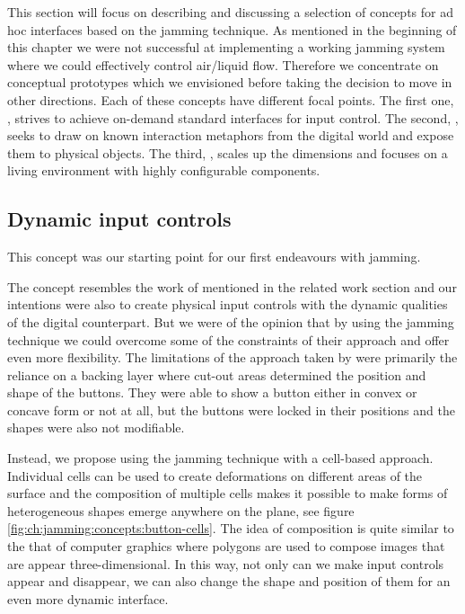 This section will focus on describing and discussing a selection of concepts for ad hoc interfaces based on the jamming technique.
As mentioned in the beginning of this chapter we were not successful at implementing a working jamming system where we could effectively control air/liquid flow.
Therefore we concentrate on conceptual prototypes which we envisioned before taking the decision to move in other directions.
Each of these concepts have different focal points.
The first one, \emph{}, strives to achieve on-demand standard interfaces for input control.
The second, \emph{}, seeks to draw on known interaction metaphors from the digital world and expose them to physical objects.
The third, \emph{}, scales up the dimensions and focuses on a living environment with highly configurable components.

\subsection{Dynamic input controls} 
\label{ch:jamming:concepts:dynamic_input}

This concept was our starting point for our first endeavours with jamming.

The concept resembles the work of \citet{harrison2009providing} mentioned in the related work section and our intentions were also to create physical input controls with the dynamic qualities of the digital counterpart.
But we were of the opinion that by using the jamming technique we could overcome some of the constraints of their approach and offer even more flexibility.
The limitations of the approach taken by \citet{harrison2009providing} were primarily the reliance on a backing layer where cut-out areas determined the position and shape of the buttons.
They were able to show a button either in convex or concave form or not at all, but the buttons were locked in their positions and the shapes were also not modifiable.

Instead, we propose using the jamming technique with a cell-based approach.
Individual cells can be used to create deformations on different areas of the surface and the composition of multiple cells makes it possible to make forms of heterogeneous shapes emerge anywhere on the plane, see figure \ref{fig:ch:jamming:concepts:button-cells}.
The idea of composition is quite similar to the that of computer graphics where polygons are used to compose images that are appear three-dimensional.
In this way, not only can we make input controls appear and disappear, we can also change the shape and position of them for an even more dynamic interface.

